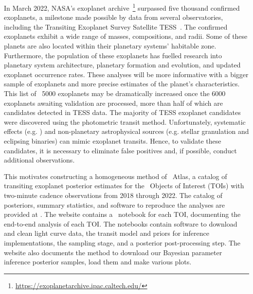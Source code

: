 \documentclass[floatfix,ApJL,twocolumn]{aastex631}
\begin{document}
In March 2022, NASA's exoplanet archive~\citep{Akeson:2013:PASP}\footnote{\href{https://exoplanetarchive.ipac.caltech.edu/}{https://exoplanetarchive.ipac.caltech.edu/}} surpassed five thousand confirmed exoplanets, a milestone made possible by data from several observatories, including the Transiting Exoplanet Survey Satellite TESS~\citep{Ricker:2015:JATIS}.
The confirmed exoplanets exhibit a wide range of masses, compositions, and radii.
Some of these planets are also located within their planetary systems' habitable zone.
Furthermore, the population of these exoplanets has fuelled research into planetary system architecture, planetary formation and evolution, and updated exoplanet occurrence rates.
These analyses will be more informative with a bigger sample of exoplanets and more precise estimates of the planet's characteristics.
This list of ~5000 exoplanets may be dramatically increased once the 6000 exoplanets awaiting validation are processed, more than half of which are candidates detected in TESS data.
The majority of TESS exoplanet candidates were discovered using the photometric transit method.
Unfortunately, systematic effects (e.g. ) and non-planetary astrophysical sources (e.g. stellar granulation and eclipsing binaries) can mimic exoplanet transits.
Hence, to validate these candidates, it is necessary to eliminate false positives and, if possible, conduct additional observations. 



This motivates constructing a homogeneous method of \tess\ Atlas, a catalog of transiting exoplanet posterior estimates for the \red{\numAnalysed} \tess\ Objects of Interest (TOIs) with two-minute cadence observations from 2018 through 2022.
The catalog of posteriors, summary statistics, and software to reproduce the analyses are provided at \atlasUrl.
The website contains a \jupyter\ notebook for each TOI, documenting the end-to-end analysis of each TOI.
The notebooks contain software to download and clean light curve data, the transit model and priors for inference implementations, the \pymc sampling stage, and a posterior post-processing step.
The website also documents the method to download our Bayesian parameter inference posterior samples, load them and make various plots.
\end{document}
